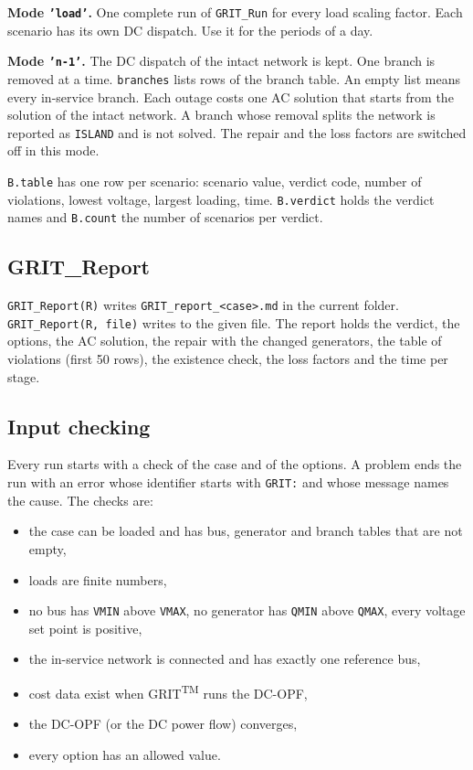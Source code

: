 \documentclass[a4paper,11pt]{article}
\newcommand{\TM}{\textsuperscript{TM}}
\newcommand{\GRIT}{GRIT\TM}
\begin{document}
\textbf{Mode \texttt{'load'}.} One complete run of \texttt{GRIT\_Run} for every load scaling factor. Each scenario has its own DC dispatch. Use it for the periods of a day.

\textbf{Mode \texttt{'n-1'}.} The DC dispatch of the intact network is kept. One branch is removed at a time. \texttt{branches} lists rows of the branch table. An empty list means every in-service branch. Each outage costs one AC solution that starts from the solution of the intact network. A branch whose removal splits the network is reported as \texttt{ISLAND} and is not solved. The repair and the loss factors are switched off in this mode.

\texttt{B.table} has one row per scenario: scenario value, verdict code, number of violations, lowest voltage, largest loading, time. \texttt{B.verdict} holds the verdict names and \texttt{B.count} the number of scenarios per verdict.

\subsection{GRIT\_Report}

\texttt{GRIT\_Report(R)} writes \texttt{GRIT\_report\_<case>.md} in the current folder. \texttt{GRIT\_Report(R, file)} writes to the given file. The report holds the verdict, the options, the AC solution, the repair with the changed generators, the table of violations (first 50 rows), the existence check, the loss factors and the time per stage.

\subsection{Input checking}\label{sec:inputcheck}

Every run starts with a check of the case and of the options. A problem ends the run with an error whose identifier starts with \texttt{GRIT:} and whose message names the cause. The checks are:

\begin{itemize}[nosep]
  \item the case can be loaded and has bus, generator and branch tables that are not empty,
  \item loads are finite numbers,
  \item no bus has \texttt{VMIN} above \texttt{VMAX}, no generator has \texttt{QMIN} above \texttt{QMAX}, every voltage set point is positive,
  \item the in-service network is connected and has exactly one reference bus,
  \item cost data exist when \GRIT{} runs the DC-OPF,
  \item the DC-OPF (or the DC power flow) converges,
  \item every option has an allowed value.
\end{itemize}
\end{document}
